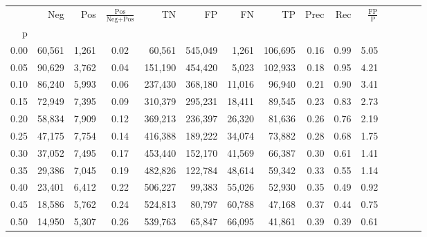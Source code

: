 \begin{tabular}{rrrcrrrrrrrrrrr}
\toprule
{} &     Neg &     Pos & $\frac{\text{Pos}}{\text{Neg}+\text{Pos}}$ &       TN &       FP &       FN &       TP &  Prec &   Rec & $\frac{\text{FP}}{\text{P}}$ \\
p    &         &         &                                            &          &          &          &          &       &       &                              \\
\midrule
0.00 &  60,561 &   1,261 &                                       0.02 &   60,561 &  545,049 &    1,261 &  106,695 &  0.16 &  0.99 &                         5.05 \\
0.05 &  90,629 &   3,762 &                                       0.04 &  151,190 &  454,420 &    5,023 &  102,933 &  0.18 &  0.95 &                         4.21 \\
0.10 &  86,240 &   5,993 &                                       0.06 &  237,430 &  368,180 &   11,016 &   96,940 &  0.21 &  0.90 &                         3.41 \\
0.15 &  72,949 &   7,395 &                                       0.09 &  310,379 &  295,231 &   18,411 &   89,545 &  0.23 &  0.83 &                         2.73 \\
0.20 &  58,834 &   7,909 &                                       0.12 &  369,213 &  236,397 &   26,320 &   81,636 &  0.26 &  0.76 &                         2.19 \\
0.25 &  47,175 &   7,754 &                                       0.14 &  416,388 &  189,222 &   34,074 &   73,882 &  0.28 &  0.68 &                         1.75 \\
0.30 &  37,052 &   7,495 &                                       0.17 &  453,440 &  152,170 &   41,569 &   66,387 &  0.30 &  0.61 &                         1.41 \\
0.35 &  29,386 &   7,045 &                                       0.19 &  482,826 &  122,784 &   48,614 &   59,342 &  0.33 &  0.55 &                         1.14 \\
0.40 &  23,401 &   6,412 &                                       0.22 &  506,227 &   99,383 &   55,026 &   52,930 &  0.35 &  0.49 &                         0.92 \\
0.45 &  18,586 &   5,762 &                                       0.24 &  524,813 &   80,797 &   60,788 &   47,168 &  0.37 &  0.44 &                         0.75 \\
0.50 &  14,950 &   5,307 &                                       0.26 &  539,763 &   65,847 &   66,095 &   41,861 &  0.39 &  0.39 &                         0.61 \\

\end{tabular}
